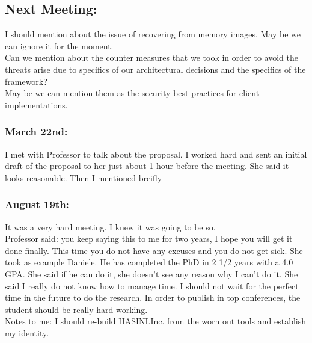 \documentclass[11pt]{article}
\begin{document}
\subsection*{Next Meeting:}
I should mention about the issue of recovering from memory images. May be we can ignore it for the moment.\\
Can we mention about the counter measures that we took in order to avoid the threats arise due to specifics of our architectural decisions and the 
specifics of the framework?\\
May be we can mention them as the security best practices for client implementations.

\subsubsection*{March 22nd:}
I met with Professor to talk about the proposal. I worked hard and sent an initial draft of the proposal to her just about 1 hour before the meeting. 
She said it looks reasonable. Then I mentioned breifly

\subsubsection*{August 19th:}
It was a very hard meeting. I knew it was going to be so.\\
Professor said: you keep saying this to me for two years, I hope you will get it done finally. This time you do not have any excuses and you do not 
get sick. She took as example Daniele. He has completed the PhD in 2 1/2 years with a 4.0 GPA. She said if he can do it, she doesn't see any reason 
why I can't do it. She said I really do not know how to manage time. I should not wait for the perfect time in the future to do the research. In 
order to publish in top conferences, the student should be really hard working. \\

Notes to me: I should re-build HASINI.Inc. from the worn out tools and establish my identity.\\
\end{document}
